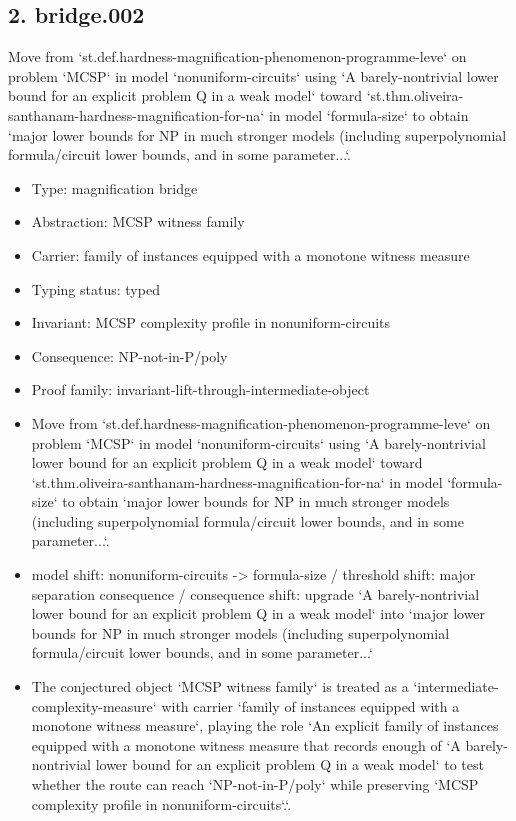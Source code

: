 \documentclass[11pt]{article}
\begin{document}
\subsection*{2. bridge.002}
Move from `st.def.hardness-magnification-phenomenon-programme-leve` on problem `MCSP` in model `nonuniform-circuits` using `A barely-nontrivial lower bound for an explicit problem Q in a weak model` toward `st.thm.oliveira-santhanam-hardness-magnification-for-na` in model `formula-size` to obtain `major lower bounds for NP in much stronger models (including superpolynomial formula/circuit lower bounds, and in some parameter...`.
\begin{itemize}
\item Type: magnification bridge
\item Abstraction: MCSP witness family
\item Carrier: family of instances equipped with a monotone witness measure
\item Typing status: typed
\item Invariant: MCSP complexity profile in nonuniform-circuits
\item Consequence: NP-not-in-P/poly
\item Proof family: invariant-lift-through-intermediate-object
\item Move from `st.def.hardness-magnification-phenomenon-programme-leve` on problem `MCSP` in model `nonuniform-circuits` using `A barely-nontrivial lower bound for an explicit problem Q in a weak model` toward `st.thm.oliveira-santhanam-hardness-magnification-for-na` in model `formula-size` to obtain `major lower bounds for NP in much stronger models (including superpolynomial formula/circuit lower bounds, and in some parameter...`.
\item model shift: nonuniform-circuits -> formula-size / threshold shift: major separation consequence / consequence shift: upgrade `A barely-nontrivial lower bound for an explicit problem Q in a weak model` into `major lower bounds for NP in much stronger models (including superpolynomial formula/circuit lower bounds, and in some parameter...`
\item The conjectured object `MCSP witness family` is treated as a `intermediate-complexity-measure` with carrier `family of instances equipped with a monotone witness measure`, playing the role `An explicit family of instances equipped with a monotone witness measure that records enough of `A barely-nontrivial lower bound for an explicit problem Q in a weak model` to test whether the route can reach `NP-not-in-P/poly` while preserving `MCSP complexity profile in nonuniform-circuits`.`.

\end{itemize}
\end{document}
